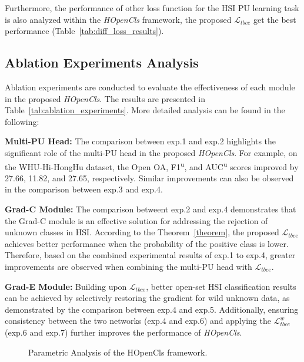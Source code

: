 

Furthermore, the performance of other loss function for the HSI PU learning task is also analyzed within the \textit{HOpenCls} framework, the proposed $\mathcal{L}_{tbce}$ get the best performance (Table~\ref{tab:diff_loss_results}).



\subsection{Ablation Experiments Analysis}

Ablation experiments are conducted to evaluate the effectiveness of each module in the proposed \textit{HOpenCls}. The results are presented in Table~\ref{tab:ablation_experiments}. More detailed analysis can be found in the following:

\noindent \textbf{Multi-PU Head:}
The comparison between exp.1 and exp.2 highlights the significant role of the multi-PU head in the proposed \textit{HOpenCls}. For example, on the WHU-Hi-HongHu dataset, the Open OA, F1\textsuperscript{u}, and AUC\textsuperscript{u} scores improved by 27.66, 11.82, and 27.65, respectively. Similar improvements can also be observed in the comparison between exp.3 and exp.4.

\noindent \textbf{Grad-C Module:}
The comparison betweent exp.2 and exp.4 demonstrates that the Grad-C module is an effective solution for addressing the rejection of unknown classes in HSI. According to the Theorem~\ref{theorem}, the proposed $\mathcal{L}_{tbce}$ achieves better performance when the probability of the positive class is lower. Therefore, based on the combined experimental results of exp.1 to exp.4, greater improvements are observed when combining the multi-PU head with $\mathcal{L}_{tbce}$.

\noindent \textbf{Grad-E Module:}
Building upon $\mathcal{L}_{tbce}$, better open-set HSI classification results can be achieved by selectively restoring the gradient for wild unknown data, as demonstrated by the comparison between exp.4 and exp.5. Additionally, ensuring consistency between the two networks (exp.4 and exp.6) and applying the $\mathcal{L}_{tbce}^{w}$ (exp.6 and exp.7) further improves the performance of \textit{HOpenCls}.



\begin{figure*}[!t]
    \centering
    \caption{Parametric Analysis of the HOpenCls framework.}
    \label{fig:parametric_analysis}
\end{figure*}


